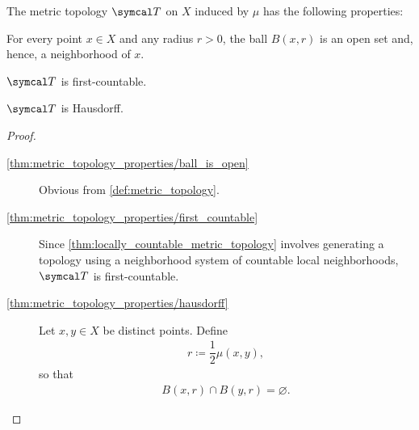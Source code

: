 \begin{proposition}\label{thm:metric_topology_properties}
  The metric topology \( \Cal{T} \) on \( X \) induced by \( \mu \) has the following properties:
  \begin{defenum}
    \item\label{thm:metric_topology_properties/ball_is_open} For every point \( x \in X \) and any radius \( r > 0 \), the ball \( B(x, r) \) is an open set and, hence, a neighborhood of \( x \).
    \item\label{thm:metric_topology_properties/first_countable} \( \Cal{T} \) is first-countable.
    \item\label{thm:metric_topology_properties/hausdorff} \( \Cal{T} \) is Hausdorff.
  \end{defenum}
\end{proposition}
\begin{proof}
  \begin{description}
    \item[\ref{thm:metric_topology_properties/ball_is_open}] Obvious from \cref{def:metric_topology}.

    \item[\ref{thm:metric_topology_properties/first_countable}] Since \cref{thm:locally_countable_metric_topology} involves generating a topology using a neighborhood system of countable local neighborhoods, \( \Cal{T} \) is first-countable.

    \item[\ref{thm:metric_topology_properties/hausdorff}] Let \( x, y \in X \) be distinct points. Define
    \begin{align*}
      r \coloneqq \dfrac 1 2 \mu(x, y),
    \end{align*}
    so that
    \begin{align*}
      B(x, r) \cap B(y, r) = \varnothing.
    \end{align*}
  \end{description}
\end{proof}


